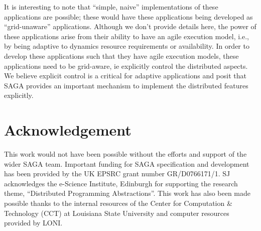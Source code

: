 \documentclass[conference,final]{IEEEtran}
\newcommand{\up}{\vspace*{-1em}}
\newcommand{\upp}{\vspace*{-0.5em}}
\begin{document}
It is interesting to note that ``simple, naive'' implementations of
these applications are possible; these would have these applications
being developed as ``grid-unaware'' applications.  Although we don't
provide details here, the power of these applications arise from their
ability to have an agile execution model, i.e., by being adaptive to
dynamics resource requirements or availability. In order to develop
these applications such that they have agile execution models, these
applications need to be grid-aware, ie explicitly control the
distributed aspects. We believe explicit control is a critical for
adaptive applications and posit that SAGA provides an important
mechanism to implement the distributed features explicitly.

\up\upp

\section*{Acknowledgement}

\up\upp

This work would not have been possible without the efforts and support
of the wider SAGA team. Important funding for SAGA specification and
development has been provided by the UK EPSRC grant number
GR/D0766171/1.  SJ acknowledges the e-Science Institute, Edinburgh for
supporting the research theme, ``Distributed Programming
Abstractions''.  This work has also been made possible thanks to the
internal resources of the Center for Computation \& Technology (CCT)
at Louisiana State University and computer resources provided by LONI.

\up\upp



\end{document}
